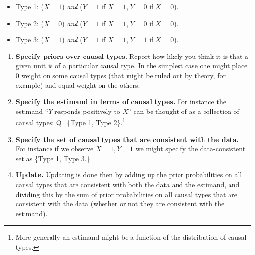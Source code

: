 \documentclass[12pt,]{book}
\providecommand{\tightlist}{%
  \setlength{\itemsep}{0pt}\setlength{\parskip}{0pt}}
\let\rmarkdownfootnote\footnote%
\def\footnote{\protect\rmarkdownfootnote}
\begin{document}
\begin{itemize}
\tightlist
\item
  Type 1: (\(X=1\)) \emph{and} (\(Y=1\) if \(X=1\), \(Y=0\) if \(X=0\)).
\item
  Type 2: (\(X=0\)) \emph{and} (\(Y=1\) if \(X=1\), \(Y=0\) if \(X=0\)).
\item
  Type 3: (\(X=1\)) \emph{and} (\(Y=1\) if \(X=1\), \(Y=1\) if \(X=0\)).
\end{itemize}

\begin{enumerate}
\def\labelenumi{\arabic{enumi}.}
\setcounter{enumi}{1}
\item
  \textbf{Specify priors over causal types.} Report how likely you think it is that a given unit is of a particular causal type. In the simplest case one might place 0 weight on some causal types (that might be ruled out by theory, for example) and equal weight on the others.
\item
  \textbf{Specify the estimand in terms of causal types.} For instance the estimand ``\(Y\) responds positively to \(X\)'' can be thought of as a collection of causal types: Q=\{Type 1, Type 2\}.\footnote{More generally an estimand might be a function of the distribution of causal types.}
\item
  \textbf{Specify the set of causal types that are consistent with the data.} For instance if we observe \(X=1, Y=1\) we might specify the data-consistent set as \{Type 1, Type 3.\}.
\item
  \textbf{Update.} Updating is done then by adding up the prior probabilities on all causal types that are consistent with both the data and the estimand, and dividing this by the sum of prior probabilities on all causal types that are consistent with the data (whether or not they are consistent with the estimand).
\end{enumerate}
\end{document}
